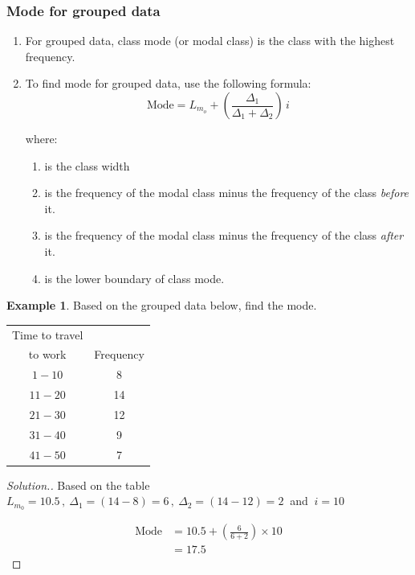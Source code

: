 \documentclass[11pt,a4paper]{article}
\theoremstyle{definition}
\newtheorem{example}[thm]{Example}
\newenvironment{solution}
  {\renewcommand{\qedsymbol}{}\begin{proof}[\textit{Solution}.]}
  {\end{proof}}
\begin{document}
\subsubsection{Mode for grouped data}
\begin{enumerate}
\item[$\bullet$] For grouped data, class mode (or modal class) is the class with the highest frequency.
\item[$\bullet$] To find mode for grouped data, use the following formula: \[\text{Mode} = L_{m_o} + \left(\frac{\Delta_1}{\Delta_1 + \Delta_2}\right)\, i\]

where:
\begin{enumerate}
\item[$i$] is the class width
\item[$\Delta_1$] is the frequency of the modal class minus the frequency of the class \emph{before} it.
\item[$\Delta_2$] is the frequency of the modal class minus the frequency of the class \emph{after} it.
\item[$L_{m_0}$] is the lower boundary of class mode.\\[1ex]
\end{enumerate}
\end{enumerate}




\begin{example}
Based on the grouped data below, find the mode.
\begin{table}[H]
\centering
\begin{tabular}{|c|c|}
\hline
Time to travel & \\
to work        & Frequency\\
\hline
$1 - 10$ & 8\\
$11 - 20$ & 14\\
$21 - 30$ & 12\\
$31 - 40$ & 9\\
$41 - 50$ & 7\\
\hline
\end{tabular}
\end{table}

\vspace{0.5cm}
\end{example}

\begin{solution}
Based on the table\  $L_{m_0} = 10.5\,,\  \Delta_1 = (14-8)=6\,,\ \Delta_2 = (14-12)=2\ $ and $\  i = 10$

\begin{align*}
\text{Mode}  & = 10.5 + \left(\frac{6}{6 + 2}\right)\times 10\\
& = 17.5
\end{align*}
\end{solution}
\end{document}
